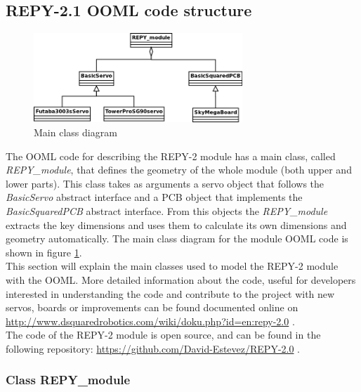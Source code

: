 \subsection{REPY-2.1 OOML code structure}
\label{hardware_ooml_structure}

\begin{figure}[h]
		\centering
        \includegraphics[width=0.7\textwidth]{images/REPY2_class_diagram_main.png}
        \caption{Main class diagram}
        \label{fig:hardware_class_diagram_main}
\end{figure} 


The OOML code for describing the REPY-2 module has a main class, called \emph{REPY\_module}, that defines the geometry of the whole module (both upper and lower parts). This class takes as arguments a servo object that follows the \emph{BasicServo} abstract interface and a PCB object that implements the \emph{BasicSquaredPCB} abstract interface. From this objects the \emph{REPY\_module} extracts the key dimensions and uses them to calculate its own dimensions and geometry automatically. The main class diagram for the module OOML code is shown in figure \ref{fig:hardware_class_diagram_main}.\\

This section will explain the main classes used to model the REPY-2 module with the OOML. More detailed information about the code, useful for developers interested in understanding the code and contribute to the project with new servos, boards or improvements can be found documented online on \url{http://www.dsquaredrobotics.com/wiki/doku.php?id=en:repy-2.0} .\\

The code of the REPY-2 module is open source, and can be found in the following repository: \url{https://github.com/David-Estevez/REPY-2.0} .

\subsubsection{Class REPY\_module}

